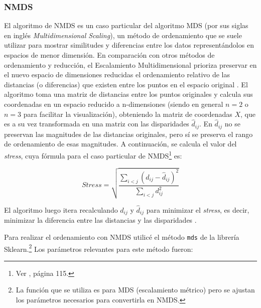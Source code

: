 \documentclass[10 pt]{article}
\begin{document}
\subsubsection*{NMDS}

El algoritmo de NMDS es un caso particular del algoritmo MDS (por sus siglas en inglés \textit{Multidimensional Scaling}), un método de ordenamiento que se suele utilizar para mostrar similitudes y diferencias entre los datos representándolos en espacios de menor dimensión. En comparación con otros métodos de ordenamiento y reducción, el Escalamiento Multidimensional prioriza preservar en el nuevo espacio de dimensiones reducidas el ordenamiento relativo de las distancias (o diferencias) que existen entre los puntos en el espacio original \citetext{\citealp[p. 218]{aid}}.
El algoritmo toma una matriz de distancias entre los puntos originales y calcula sus coordenadas en un espacio reducido a n-dimensiones (siendo en general \(n=2\) o \(n=3\) para facilitar la visualización), obteniendo la matriz de coordenadas \(X\), %
que es a su vez transformada en una matriz con las disparidades \(\hat{d}_{ij}\). En \(\hat{d}_{ij}\) no se preservan las magnitudes de las distancias originales, pero sí se preserva el rango de ordenamiento de esas magnitudes\citetext{\citealp[p. 219,220]{aid}}. A continuación, se calcula el valor del \textit{stress}, cuya fórmula para el caso particular de NMDS\footnote{ Ver \cite{kruskal1964nonmetric}, página 115.} es: 

\[\textit{Stress} = \sqrt{\frac{\sum_{i<j} \left( d_{ij} - \hat{d}_{ij} \right)^2}{\sum_{i<j} d_{ij}^2}}\]

El algoritmo luego itera recalculando \(d_{ij}\) y \(\hat{d}_{ij}\) para minimizar el \textit{stress}, es decir, minimizar la diferencia entre las distancias y las disparidades \citetext{\citealp[p. 117-123]{kruskal1964nonmetric}}. 


Para realizar el ordenamiento con NMDS utilicé el método \texttt{mds} de la librería Sklearn.\footnote{La función que se utiliza es para MDS (escalamiento métrico) pero se ajustan los parámetros necesarios para convertirla en NMDS.} Los parámetros relevantes para este método fueron:
 
\end{document}
